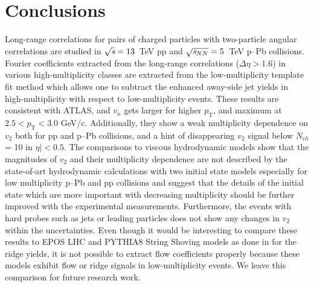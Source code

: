 
\section{Conclusions}
\label{sec:summary}
Long-range correlations for pairs of charged particles with two-particle angular correlations are studied in ${\sqrt{{\textit s}}}=13$~TeV pp and ${\sqrt{{\textit s_{NN}}}}=5$~TeV p--Pb collisions. Fourier coefficients extracted from the long-range correlations ($\Delta\eta > 1.6$) in various high-multiplicity classes are extracted from the low-multiplicity template fit method which allows one to subtract the enhanced away-side jet yields in high-multiplicity with respect to low-multiplicity events.
These results are consistent with ATLAS, and $v_n$ gets larger for higher $p_\mathrm{T}$, and maximum at $2.5<p_\mathrm{T}<3.0$ GeV/c. 
Additionally, they show a weak multiplicity dependence on $v_2$ both for pp and p--Pb collisions, and a hint of disappearing $v_2$ signal below $N_{ch}$ = 10 in $\eta|<0.5$. 
The comparisons to viscous hydrodynamic models show that the magnitudes of $v_2$ and their multiplicity dependence are not described by the state-of-art hydrodynamic calculations with two initial state models especially for low multiplicity p--Pb and pp collisions and suggest that the details of the initial state which are more important with decreasing multiplicity should be further improved with the experimental measurements. 
Furthermore, the events with hard probes such as jets or leading particles does not show any changes in $v_2$ within the uncertainties. 
Even though it would be interesting to compare these results to EPOS LHC and PYTHIA8 String Shoving models as done in \cite{ALICE:2012eyl} for the ridge yields, it is not possible to extract flow coefficients properly because these models exhibit flow or ridge signals in low-multiplicity events. We leave this comparison for future research work.

